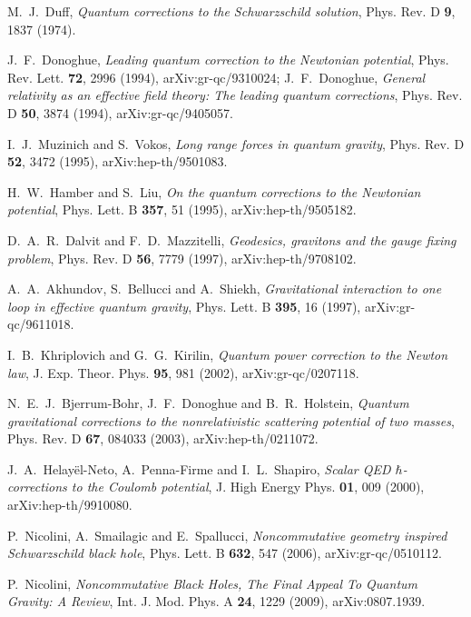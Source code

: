 \documentclass[aps,prd,a4paper,twocolumn,showpacs,showkeys,preprintnumbers,amsmath,amssymb,nofootinbib]{revtex4-2}
\numberwithin{equation}{section}
\begin{document}
\begin{thebibliography}{}
M.~J.~Duff,
{\it Quantum corrections to the Schwarzschild solution},
Phys. Rev. D \textbf{9}, 1837 (1974).

J.~F.~Donoghue,
{\it Leading quantum correction to the Newtonian potential},
Phys. Rev. Lett. \textbf{72}, 2996 (1994),
arXiv:gr-qc/9310024;
J.~F.~Donoghue,
{\it General relativity as an effective field theory: The leading quantum corrections},
Phys. Rev. D \textbf{50}, 3874 (1994),
arXiv:gr-qc/9405057.

I.~J.~Muzinich and S.~Vokos,
{\it Long range forces in quantum gravity},
Phys. Rev. D \textbf{52}, 3472 (1995),
arXiv:hep-th/9501083.

H.~W.~Hamber and S.~Liu,
{\it On the quantum corrections to the Newtonian potential},
Phys. Lett. B \textbf{357}, 51 (1995),
arXiv:hep-th/9505182.

D.~A.~R.~Dalvit and F.~D.~Mazzitelli,
{\it Geodesics, gravitons and the gauge fixing problem},
Phys. Rev. D \textbf{56}, 7779 (1997), 
arXiv:hep-th/9708102.

A.~A.~Akhundov, S.~Bellucci and A.~Shiekh,
{\it Gravitational interaction to one loop in effective quantum gravity},
Phys. Lett. B \textbf{395}, 16 (1997),
arXiv:gr-qc/9611018.

I.~B.~Khriplovich and G.~G.~Kirilin,
{\it Quantum power correction to the Newton law},
J. Exp. Theor. Phys. \textbf{95}, 981 (2002),
arXiv:gr-qc/0207118.

N.~E.~J.~Bjerrum-Bohr, J.~F.~Donoghue and B.~R.~Holstein,
{\it Quantum gravitational corrections to the nonrelativistic scattering potential of two masses},
Phys. Rev. D \textbf{67}, 084033 (2003),
arXiv:hep-th/0211072.

J.~A.~Helay\"el-Neto, A.~Penna-Firme and I.~L.~Shapiro,
{\it Scalar QED $\hbar$-corrections to the Coulomb potential},
J. High Energy Phys. \textbf{01}, 009 (2000),
arXiv:hep-th/9910080.

P.~Nicolini, A.~Smailagic and E.~Spallucci,
{\it Noncommutative geometry inspired Schwarzschild black hole},
Phys. Lett. B \textbf{632}, 547 (2006),
arXiv:gr-qc/0510112.

P.~Nicolini,
{\it Noncommutative Black Holes, The Final Appeal To Quantum Gravity: A Review}, 
Int. J. Mod. Phys. A \textbf{24}, 1229 (2009),
arXiv:0807.1939.


\end{thebibliography}
\end{document}
